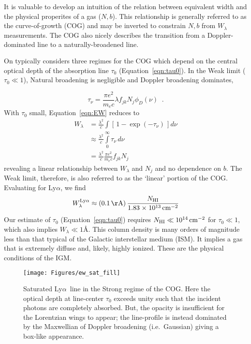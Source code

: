 \documentclass[graybox]{svmult}
\def\lya{Ly$\alpha$}
\def\ltk{\left [ \,}
\def\rtk{\, \right  ] }
\def\sci#1{{\; \times \; 10^{#1}}}
\def\intl{\int\limits}
\newcommand{\mnhi}{N_{\rm HI}}
\def\cm#1{\, {\rm cm^{#1}}}
\begin{document}
It is valuable to develop an intuition 
of the relation between equivalent width and the
physical properites of a gas ($N,b$).  This 
relationship is generally referred to as the
curve-of-growth (COG) and may be inverted to
constrain $N,b$ from $W_\lambda$ measurements.
The COG also nicely describes the transition from a 
Doppler-dominated line to a naturally-broadened line.

On typically considers three regimes for the COG
which depend on the central optical depth of the
absorption line $\tau_0$
(Equation~\ref{eqn:tau0}).
In the Weak limit ($\tau_0 \ll 1$), Natural 
broadening is negligible and Doppler broadening
dominates,

\begin{equation}
\tau_\nu = \frac{\pi e^2}{m_e c} \lambda f_{jk} N_j \phi_D(\nu)  \;\; .
\end{equation}
With $\tau_0$ small, Equation~\ref{eqn:EW} reduces to
\begin{align}
W_\lambda &= \frac{\lambda^2}{c} \int \ltk 1 - \exp(-\tau_\nu) \rtk d\nu \\
  & \approx \frac{\lambda^2}{c} \intl_0^\infty \tau_\nu \, d\nu \\
  & = \frac{\lambda^2}{c} \frac{\pi e^2}{m_e c} f_{jk} N_j 
\end{align}
revealing a linear relationship between $W_\lambda$ and $N_j$
and no dependence on $b$.
The Weak limit, therefore, is also referred
to as the `linear' portion of the COG.
Evaluating for \lya, we find
\begin{equation}
W_\lambda^{\rm Ly\alpha} \approx (0.1 \, {\rm \AA}) \, \frac{N_{\rm HI}}{1.83 \sci{13} \cm{-2}} 
\end{equation}
Our estimate of $\tau_0$ (Equation~\ref{eqn:tau0})
requires $\mnhi \ll 10^{14} \cm{-2}$ for $\tau_0 \ll 1$,
which also implies $W_\lambda \ll 1$\AA.
This column density is many orders of magnitude less than 
that typical of the Galactic interstellar medium (ISM).  
It implies a gas that 
is extremely diffuse and, likely, highly ionized.  These
are the physical conditions of the IGM.



%
\begin{figure}[b]
\sidecaption
\texttt{[image: Figures/ew\_sat\_fill]}
%
%
\caption{Saturated \lya\ line in the Strong regime of the COG.
Here the optical depth at line-center $\tau_0$ exceeds unity
such that the incident photons are completely absorbed.
But, the opacity is insufficient for the Lorentzian wings
to appear;  the line-profile is instead dominated by the
Maxwellian of Doppler broadening
(i.e.\ Gaussian) giving a box-like appearance.
}
\label{fig:EWstrong}       %
\end{figure}
\end{document}
